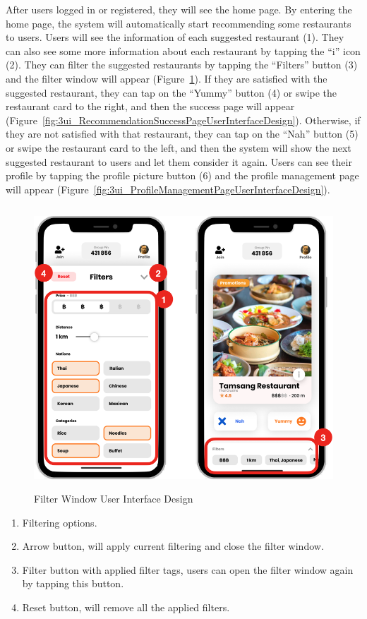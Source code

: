 \documentclass[12pt,oneside,openright,a4paper]{cpe-english-project}
\begin{document}
After users logged in or registered, they will see the home page. By entering the home page, the system will automatically start recommending some restaurants to users. Users will see the information of each suggested restaurant (1). They can also see some more information about each restaurant by tapping the “i” icon (2). They can filter the suggested restaurants by tapping the “Filters” button (3) and the filter window will appear (Figure~\ref{fig:3ui_FilterWindowUserInterfaceDesign}). If they are satisfied with the suggested restaurant, they can tap on the “Yummy” button (4) or swipe the restaurant card to the right, and then the success page will appear (Figure~\ref{fig:3ui_RecommendationSuccessPageUserInterfaceDesign}). Otherwise, if they are not satisfied with that restaurant, they can tap on the “Nah” button (5) or swipe the restaurant card to the left, and then the system will show the next suggested restaurant to users and let them consider it again. Users can see their profile by tapping the profile picture button (6) and the profile management page will appear (Figure~\ref{fig:3ui_ProfileManagementPageUserInterfaceDesign}).

\newpage
\begin{figure}[H]\centering
\includegraphics[height=300pt]{./images/3ui_FilterWindowUserInterfaceDesign.png}
\caption{Filter Window User Interface Design}\label{fig:3ui_FilterWindowUserInterfaceDesign}
\end{figure}

\begin{enumerate}
\item Filtering options.
\item Arrow button, will apply current filtering and close the filter window.
\item Filter button with applied filter tags, users can open the filter window again by tapping this button.
\item Reset button, will remove all the applied filters.
\end{enumerate}
\end{document}
